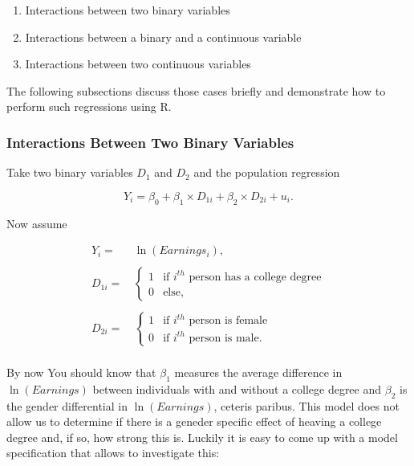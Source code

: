 \documentclass[]{book}
\theoremstyle{definition}
\theoremstyle{definition}
\theoremstyle{definition}
\theoremstyle{remark}
\begin{document}
\begin{enumerate}
\def\labelenumi{\arabic{enumi}.}
\item
  Interactions between two binary variables
\item
  Interactions between a binary and a continuous variable
\item
  Interactions between two continuous variables
\end{enumerate}

The following subsections discuss those cases briefly and demonstrate
how to perform such regressions using R.

\subsubsection*{Interactions Between Two Binary
Variables}\label{interactions-between-two-binary-variables}

Take two binary variables \(D_1\) and \(D_2\) and the population
regression

\[ Y_i = \beta_0 + \beta_1 \times D_{1i} + \beta_2 \times D_{2i} + u_i. \]

Now assume

\begin{align}
  Y_i=& \, \ln(Earnings_i),\\
  \\
  D_{1i} =& \,
   \begin{cases}
      1 & \text{if $i^{th}$ person has a college degree} \\
      0 & \text{else},
    \end{cases} \\
    \\
  D_{2i} =& \, 
    \begin{cases}
      1 & \text{if $i^{th}$ person is female} \\
      0 & \text{if $i^{th}$ person is male}.
    \end{cases}\\
\end{align}

By now You should know that \(\beta_1\) measures the average difference
in \(\ln(Earnings)\) between individuals with and without a college
degree and \(\beta_2\) is the gender differential in \(\ln(Earnings)\),
ceteris paribus. This model does not allow us to determine if there is a
geneder specific effect of heaving a college degree and, if so, how
strong this is. Luckily it is easy to come up with a model specification
that allows to investigate this:
\end{document}
